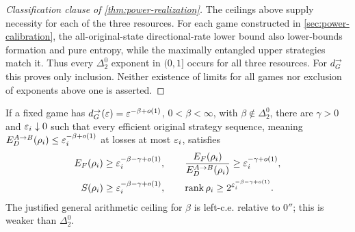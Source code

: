 \begin{proof}[Classification clause of \cref{thm:power-realization}]
The ceilings above supply necessity for each of the three resources. For each game constructed in \cref{sec:power-calibration}, the all-original-state directional-rate lower bound also lower-bounds formation and pure entropy, while the maximally entangled upper strategies match it. Thus every $\Delta^0_2$ exponent in $(0,1]$ occurs for all three resources. For $d_G^\to$ this proves only inclusion. Neither existence of limits for all games nor exclusion of exponents above one is asserted.
\end{proof}

\begin{proposition}\label{prop:power-gap}
If a fixed game has $d_G^\to(\varepsilon)=\varepsilon^{-\beta+o(1)}$, $0<\beta<\infty$, with $\beta\notin\Delta^0_2$, there are $\gamma>0$ and $\varepsilon_i\downarrow0$ such that every efficient original strategy sequence, meaning $E_D^{A\to B}(\rho_i)\le\varepsilon_i^{-\beta+o(1)}$ at losses at most $\varepsilon_i$, satisfies
\begin{gather*}
 E_F(\rho_i)\ge\varepsilon_i^{-\beta-\gamma+o(1)},\qquad
 \frac{E_F(\rho_i)}{E_D^{A\to B}(\rho_i)}\ge\varepsilon_i^{-\gamma+o(1)},\\
 S(\rho_i)\ge\varepsilon_i^{-\beta-\gamma+o(1)},\qquad
 \operatorname{rank}\rho_i\ge2^{\varepsilon_i^{-\beta-\gamma+o(1)}}.
\end{gather*}
The justified general arithmetic ceiling for $\beta$ is left-c.e. relative to $0''$; this is weaker than $\Delta^0_2$.
\end{proposition}
